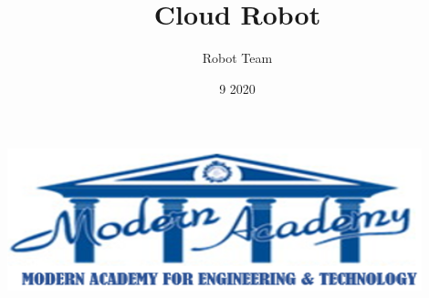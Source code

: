 \documentclass[12pt,A4]{article}
\title{Cloud Robot}
\author{Robot Team}
\date{9 2020}
\begin{document}
\begin{titlepage}
\maketitle
\end{titlepage}

\includegraphics[width=0.9\textwidth]{image1}
%

\tableofcontents



\listoffigures
\listoftables











\printbibliography
\end{document}

